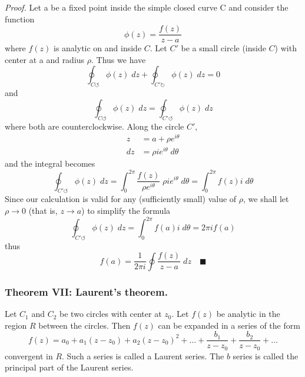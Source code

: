 \documentclass[../main.tex]{subfiles}
\begin{document}
\emph{Proof.} Let a be a ﬁxed point inside the simple closed curve C and consider the function
\begin{equation*}
    \phi(z)=\frac{f(z)}{z-a}
\end{equation*}
where $f(z)$ is analytic on and inside $C$. Let $C'$ be a small circle (inside $C$) with center at a and radius $\rho$. Thus we have 
\begin{equation*}
    \oint_{C\circlearrowleft} \phi(z)\;dz+\oint_{C'\circlearrowright} \phi(z)\;dz=0
\end{equation*}
and
\begin{equation*}
    \oint_{C\circlearrowleft} \phi(z)\;dz=\oint_{C'\circlearrowleft} \phi(z)\;dz
\end{equation*}
where both are counterclockwise. Along the circle $C'$,
\begin{align*}
    z&= a + \rho e^{i\theta}\\
    dz&=\rho i e^{i\theta}\;d\theta
\end{align*}
and the integral becomes
\begin{equation*}
    \oint_{C'\circlearrowleft} \phi(z)\;dz=\int_{0}^{2\pi} \frac{f(z)}{ \rho e^{i\theta}}\;\rho i e^{i\theta}\;d\theta=\int_{0}^{2\pi}f(z)i\;d\theta
\end{equation*}
Since our calculation is valid for any (sufficiently small) value of $\rho$, we shall let
$\rho\rightarrow0$ (that is, $z\rightarrow a$) to simplify the formula
\begin{equation*}
    \oint_{C'\circlearrowleft} \phi(z)\;dz=\int_{0}^{2\pi}f(a)i\;d\theta=2\pi if(a)
\end{equation*}
thus
\begin{equation*}
    f(a)=\frac{1}{2\pi i}\oint \frac{f(z)}{z-a}\;dz \quad \blacksquare
\end{equation*}

\subsubsection*{Theorem VII: Laurent's theorem.} Let $C_1$ and $C_2$ be two circles with center at $z_0$. Let $f(z)$ be analytic in the region $R$ between the circles. Then $f(z)$ can be expanded in a series of the form
\begin{equation*}
    f(z) = a_0 + a_1(z - z_0) + a_2(z - z_0)^2+\dots+\frac{b_1}{z-z_0}+\frac{b_2}{z-z_0}+\dots
\end{equation*}
convergent in $R$. Such a series is called a Laurent series. The $b$ series is called the principal part of the Laurent series.
\end{document}
